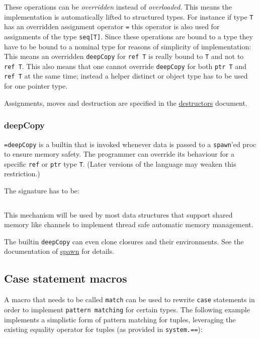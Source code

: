 These operations can be \emph{overridden} instead of \emph{overloaded}.
This means the implementation is automatically lifted to structured
types. For instance if type \texttt{T} has an overridden assignment
operator \texttt{=} this operator is also used for assignments of the
type \texttt{seq{[}T{]}}. Since these operations are bound to a type
they have to be bound to a nominal type for reasons of simplicity of
implementation: This means an overridden \texttt{deepCopy} for
\texttt{ref\ T} is really bound to \texttt{T} and not to
\texttt{ref\ T}. This also means that one cannot override
\texttt{deepCopy} for both \texttt{ptr\ T} and \texttt{ref\ T} at the
same time; instead a helper distinct or object type has to be used for
one pointer type.

Assignments, moves and destruction are specified in the
\href{destructors.html}{destructors} document.

\hypertarget{deepcopy}{%
\subsubsection{deepCopy}\label{deepcopy}}

\texttt{=deepCopy} is a builtin that is invoked whenever data is passed
to a \texttt{spawn}'ed proc to ensure memory safety. The programmer can
override its behaviour for a specific \texttt{ref} or \texttt{ptr} type
\texttt{T}. (Later versions of the language may weaken this
restriction.)

The signature has to be:

\begin{verbatim}
\end{verbatim}

This mechanism will be used by most data structures that support shared
memory like channels to implement thread safe automatic memory
management.

The builtin \texttt{deepCopy} can even clone closures and their
environments. See the documentation of
\protect\hyperlink{parallel-amp-spawn-spawn-statement}{spawn} for
details.

\hypertarget{case-statement-macros}{%
\subsection{Case statement macros}\label{case-statement-macros}}

A macro that needs to be called \texttt{match} can be used to rewrite
\texttt{case} statements in order to implement
\texttt{pattern\ matching} for certain types. The following example
implements a simplistic form of pattern matching for tuples, leveraging
the existing equality operator for tuples (as provided in
\texttt{system.==}):

